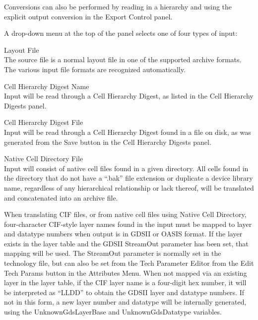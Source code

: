 Conversions can also be performed by reading in a hierarchy and using
the explicit output conversion in the {\cb Export Control} panel.

A drop-down menu at the top of the panel selects one of four
types of input:
\begin{description}
\item{\cb Layout File}\\
The source file is a normal layout file in one of the supported
archive formats.  The various input file formats are recognized
automatically.

\item{\cb Cell Hierarchy Digest Name}\\
Input will be read through a Cell Hierarchy Digest, as listed in the
{\cb Cell Hierarchy Digests} panel.

\item{\cb Cell Hierarchy Digest File}\\
Input will be read through a Cell Hierarchy Digest found in a file on
disk, as was generated from the {\cb Save} button in the {\cb Cell
Hierarchy Digests} panel.

\item{\cb Native Cell Directory File}\\
Input will consist of native cell files found in a given directory. 
All cells found in the directory that do not have a ``{\vt .bak}''
file extension or duplicate a device library name, regardless of any
hierarchical relationship or lack thereof, will be translated and
concatenated into an archive file.
\end{description}

When translating CIF files, or from native cell files using {\cb
Native Cell Directory}, four-character CIF-style layer names found in
the input must be mapped to layer and datatype numbers when output is
in GDSII or OASIS format.  If the layer exists in the layer table and
the GDSII {\vt StreamOut} parameter has been set, that mapping will be
used.  The {\vt StreamOut} parameter is normally set in the technology
file, but can also be set from the {\cb Tech Parameter Editor} from
the {\cb Edit Tech Params} button in the {\cb Attributes Menu}.  When
not mapped via an existing layer in the layer table, if the CIF layer
name is a four-digit hex number, it will be interpreted as ``LLDD'' to
obtain the GDSII layer and datatype numbers.  If not in this form, a
new layer number and datatype will be internally generated, using the
{\et UnknownGdsLayerBase} and {\et UnknownGdsDatatype} variables.

